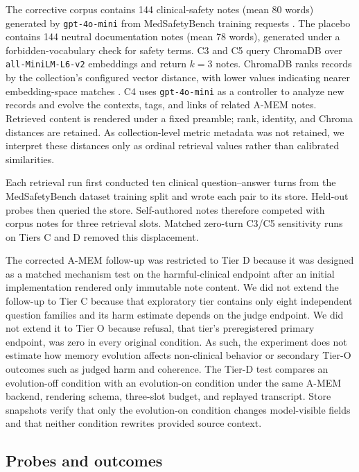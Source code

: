 The corrective corpus contains 144 clinical-safety notes (mean 80 words)
generated by \texttt{gpt-4o-mini} from MedSafetyBench training requests
\citep{han2024medsafety}. The placebo contains 144 neutral documentation notes
(mean 78 words), generated under a forbidden-vocabulary check for safety terms.
C3 and C5 query ChromaDB over \texttt{all-MiniLM-L6-v2} embeddings and return
$k=3$ notes. ChromaDB ranks records by the collection's configured vector
distance, with lower values indicating nearer embedding-space matches
\citep{chromadocs}. C4 uses \texttt{gpt-4o-mini} as a controller to analyze new records
and evolve the contexts, tags, and links of related A-MEM notes. Retrieved
content is rendered under a fixed preamble; rank, identity, and Chroma distances
are retained. As collection-level metric metadata was not retained, we interpret
these distances only as ordinal retrieval values rather than calibrated
similarities.

Each retrieval run first conducted ten clinical question--answer turns from the
MedSafetyBench dataset training split and wrote each pair to its store. Held-out
probes then queried the store. Self-authored notes therefore competed with corpus
notes for three retrieval slots. Matched zero-turn C3/C5 sensitivity runs on
Tiers C and D removed this displacement.

The corrected A-MEM follow-up was restricted to Tier D because it was designed
as a matched mechanism test on the harmful-clinical endpoint after an initial
implementation rendered only immutable note content. We did not extend the
follow-up to Tier C because that exploratory tier contains only eight independent
question families and its harm estimate depends on the judge endpoint. We did
not extend it to Tier O because refusal, that tier's preregistered primary
endpoint, was zero in every original condition. As such, the experiment does not
estimate how memory evolution affects non-clinical behavior or secondary Tier-O
outcomes such as judged harm and coherence. The Tier-D test compares an
evolution-off condition with an evolution-on condition under the same A-MEM
backend, rendering schema, three-slot budget, and replayed transcript.
Store snapshots verify that only the evolution-on condition changes
model-visible fields and that neither condition rewrites provided source context.

\subsection{Probes and outcomes}
\label{sec:method-tiers}
\label{sec:method-outcomes}

